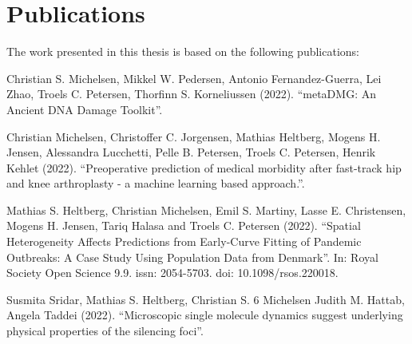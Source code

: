 \chapter{Publications}

The work presented in this thesis is based on the following publications:


Christian S. Michelsen, Mikkel W. Pedersen, Antonio Fernandez-Guerra, Lei Zhao, Troels C. Petersen, Thorfinn S. Korneliussen (2022). ``metaDMG: An Ancient DNA Damage Toolkit''.

Christian Michelsen, Christoffer C. Jorgensen, Mathias Heltberg, Mogens H. Jensen, Alessandra Lucchetti, Pelle B. Petersen, Troels C. Petersen, Henrik Kehlet (2022). ``Preoperative prediction of medical morbidity after fast-track hip and knee arthroplasty - a machine learning based approach.''.

Mathias S. Heltberg, Christian Michelsen, Emil S. Martiny, Lasse E. Christensen, Mogens H. Jensen, Tariq Halasa and Troels C. Petersen (2022). ``Spatial Heterogeneity Affects Predictions from Early-Curve Fitting of Pandemic Outbreaks: A Case Study Using Population Data from Denmark''. In: Royal Society Open Science 9.9. issn: 2054-5703. doi: 10.1098/rsos.220018.


Susmita Sridar, Mathias S. Heltberg, Christian S. 6 Michelsen Judith M. Hattab, Angela Taddei (2022). ``Microscopic single molecule dynamics suggest underlying physical properties of the silencing foci''.


